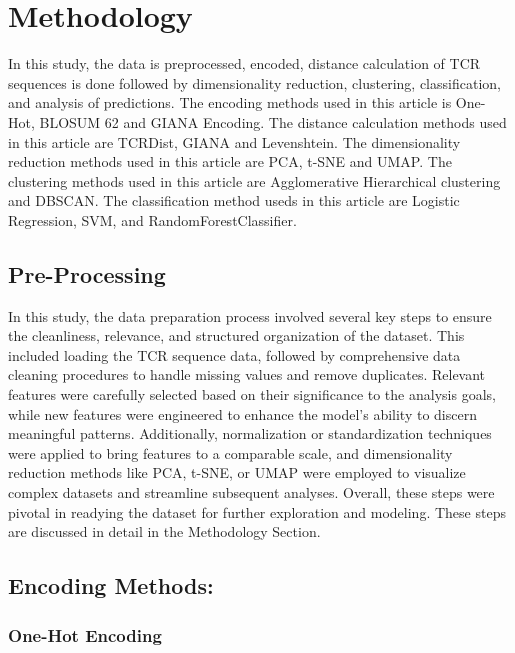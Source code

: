 \documentclass[conference]{IEEEtran}
\begin{document}
	\section{Methodology}
	In this study, the data is preprocessed, encoded, distance calculation of TCR sequences is done followed by dimensionality reduction, clustering, classification, and analysis of predictions. The encoding methods used in this article is One-Hot, BLOSUM 62 and GIANA Encoding. The distance calculation methods used in this article are TCRDist, GIANA and Levenshtein. The dimensionality reduction methods used in this article are PCA, t-SNE and UMAP. The clustering methods used in this article are Agglomerative Hierarchical clustering and DBSCAN. The classification method useds in this article are Logistic Regression, SVM, and RandomForestClassifier.
	
	
	\subsection{Pre-Processing}
	In this study, the data preparation process involved several key steps to ensure the cleanliness, relevance, and structured organization of the dataset. This included loading the TCR sequence data, followed by comprehensive data cleaning procedures to handle missing values and remove duplicates. Relevant features were carefully selected based on their significance to the analysis goals, while new features were engineered to enhance the model's ability to discern meaningful patterns. Additionally, normalization or standardization techniques were applied to bring features to a comparable scale, and dimensionality reduction methods like PCA, t-SNE, or UMAP were employed to visualize complex datasets and streamline subsequent analyses. Overall, these steps were pivotal in readying the dataset for further exploration and modeling. These steps are discussed in detail in the Methodology Section.
	
	\subsection{Encoding Methods:}
	\subsubsection{One-Hot Encoding} \
	
\end{document}
